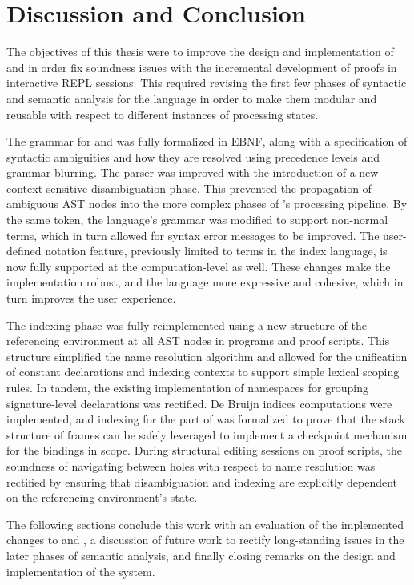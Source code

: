 \chapter{Discussion and Conclusion}\label{chapter:conclusion}

The objectives of this thesis were to improve the design and implementation of \Beluga and \Harpoon in order fix soundness issues with the incremental development of proofs in interactive \ac{REPL} sessions.
This required revising the first few phases of syntactic and semantic analysis for the language in order to make them modular and reusable with respect to different instances of processing states.

The grammar for \Beluga and \Harpoon was fully formalized in \ac{EBNF}, along with a specification of syntactic ambiguities and how they are resolved using precedence levels and grammar blurring.
The parser was improved with the introduction of a new context-sensitive disambiguation phase.
This prevented the propagation of ambiguous \ac{AST} nodes into the more complex phases of \Beluga's processing pipeline.
By the same token, the language's grammar was modified to support non-normal terms, which in turn allowed for syntax error messages to be improved.
The user-defined notation feature, previously limited to terms in the index language, is now fully supported at the computation-level as well.
These changes make the implementation robust, and the language more expressive and cohesive, which in turn improves the user experience.

The indexing phase was fully reimplemented using a new structure of the referencing environment at all \ac{AST} nodes in \Beluga programs and \Harpoon proof scripts.
This structure simplified the name resolution algorithm and allowed for the unification of constant declarations and indexing contexts to support simple lexical scoping rules.
In tandem, the existing implementation of namespaces for grouping signature-level declarations was rectified.
De Bruijn indices computations were implemented, and indexing for the \LF part of \Beluga was formalized to prove that the stack structure of frames can be safely leveraged to implement a checkpoint mechanism for the bindings in scope.
During \Harpoon structural editing sessions on proof scripts, the soundness of navigating between holes with respect to name resolution was rectified by ensuring that disambiguation and indexing are explicitly dependent on the referencing environment's state.

The following sections conclude this work with an evaluation of the implemented changes to \Beluga and \Harpoon, a discussion of future work to rectify long-standing issues in the later phases of semantic analysis, and finally closing remarks on the design and implementation of the system.

